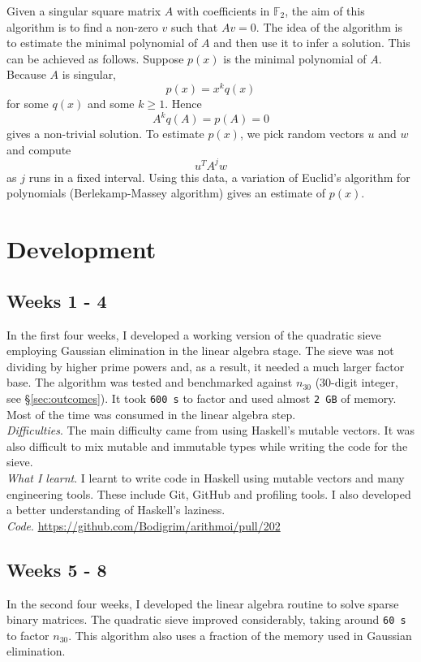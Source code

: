 \documentclass{amsart}
\theoremstyle{definition}
\theoremstyle{remark}
\numberwithin{equation}{section}
\begin{document}
Given a singular square matrix $A$ with coefficients in $\mathbb{F}_2$, the aim of this algorithm is to find a non-zero $v$ such that $Av = 0$.
The idea of the algorithm is to estimate the minimal polynomial of $A$ and then use it to infer a solution. This can be achieved as follows. Suppose $p(x)$ is the minimal polynomial of $A$. Because $A$ is singular, $$p(x) = x^k q(x) $$
for some $q(x)$ and some $k \geq 1$. Hence $$ A^k q(A) = p(A) = 0$$ gives a non-trivial solution. To estimate $p(x)$, we pick random vectors $u$ and $w$ and compute $$u^T A ^ j w$$ as $j$ runs in a fixed interval. Using this data, a variation of Euclid's algorithm for polynomials (Berlekamp-Massey algorithm) gives an estimate of $p(x)$.

\section{Development}

\subsection*{Weeks 1 - 4}
In the first four weeks, I developed a working version of the quadratic sieve employing Gaussian elimination in the linear algebra stage. The sieve was not dividing by higher prime powers and, as a result, it needed a much larger factor base. The algorithm was tested and benchmarked against $n_{30}$ (30-digit integer, see \S \ref{sec:outcomes}). It took \texttt{600 s} to factor and used almost \texttt{2 GB} of memory. Most of the time was consumed in the linear algebra step. \\

\emph{Difficulties}. The main difficulty came from using Haskell's mutable vectors. It was also difficult to mix mutable and immutable types while writing the code for the sieve.\\

\emph{What I learnt}. I learnt to write code in Haskell using mutable vectors and many engineering tools. These include Git, GitHub and profiling tools. I also developed a better understanding of Haskell's laziness.\\

\emph{Code}. \url{https://github.com/Bodigrim/arithmoi/pull/202}

\subsection*{Weeks 5 - 8}
In the second four weeks, I developed the linear algebra routine to solve sparse binary matrices. The quadratic sieve improved considerably, taking around \texttt{60 s} to factor $n_{30}$. This algorithm also uses a fraction of the memory used in Gaussian elimination. \\
\end{document}
